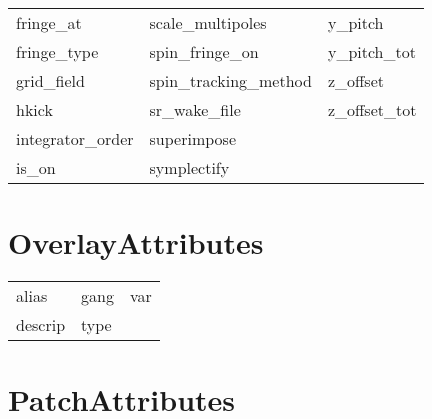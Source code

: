 \begin{tabular}{lll}
fringe_at                   & scale_multipoles            & y_pitch                     \\
fringe_type                 & spin_fringe_on              & y_pitch_tot                 \\
grid_field                  & spin_tracking_method        & z_offset                    \\
hkick                       & sr_wake_file                & z_offset_tot                \\
integrator_order            & superimpose                 &                             \\
is_on                       & symplectify                 &                             \\
 \bottomrule
 \end{tabular}
 \vfill
 
 \section{OverlayAttributes}
 \label{s:list.overlay}
 
 \begin{tabular}{lll} \toprule
alias                       & gang                        & var                         \\
descrip                     & type                        &                             \\
 \bottomrule
 \end{tabular}
 \vfill
 
 \section{PatchAttributes}
 \label{s:list.patch}
 
